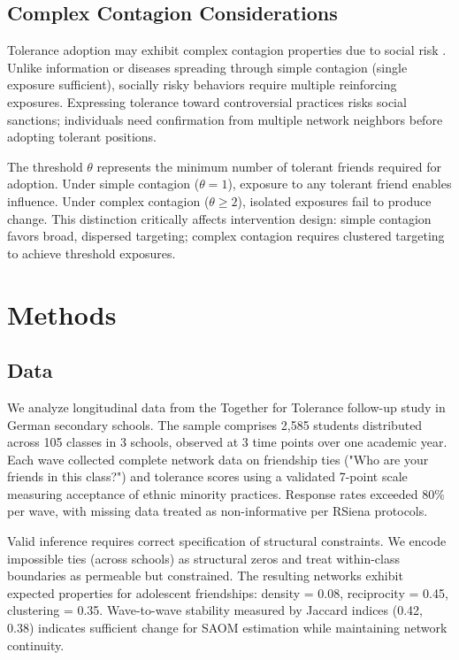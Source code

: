 \documentclass[12pt,a4paper]{article}
\begin{document}
\subsection{Complex Contagion Considerations}

Tolerance adoption may exhibit complex contagion properties due to social risk \citep{centola2010spread}. Unlike information or diseases spreading through simple contagion (single exposure sufficient), socially risky behaviors require multiple reinforcing exposures. Expressing tolerance toward controversial practices risks social sanctions; individuals need confirmation from multiple network neighbors before adopting tolerant positions.

The threshold $\theta$ represents the minimum number of tolerant friends required for adoption. Under simple contagion ($\theta = 1$), exposure to any tolerant friend enables influence. Under complex contagion ($\theta \geq 2$), isolated exposures fail to produce change. This distinction critically affects intervention design: simple contagion favors broad, dispersed targeting; complex contagion requires clustered targeting to achieve threshold exposures.


\section{Methods}

\subsection{Data}

We analyze longitudinal data from the Together for Tolerance follow-up study in German secondary schools. The sample comprises 2,585 students distributed across 105 classes in 3 schools, observed at 3 time points over one academic year. Each wave collected complete network data on friendship ties ("Who are your friends in this class?") and tolerance scores using a validated 7-point scale measuring acceptance of ethnic minority practices. Response rates exceeded 80\% per wave, with missing data treated as non-informative per RSiena protocols.

Valid inference requires correct specification of structural constraints. We encode impossible ties (across schools) as structural zeros and treat within-class boundaries as permeable but constrained. The resulting networks exhibit expected properties for adolescent friendships: density = 0.08, reciprocity = 0.45, clustering = 0.35. Wave-to-wave stability measured by Jaccard indices (0.42, 0.38) indicates sufficient change for SAOM estimation while maintaining network continuity.
\end{document}

